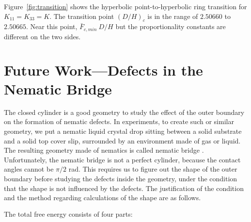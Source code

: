 \documentclass[nottitlepage]{article}
\begin{document}
       Figure~\ref{fig:transition} shows the hyperbolic point-to-hyperbolic ring transition for $K_{11}=K_{33}=K$. The transition point $(D/H)_c$ is in the range of $2.50660$ to $2.50665$. Near this point,  $\bar{F}_{c,min}~ D/H$ but the proportionality constants are different on the two sides.


     

     \section{Future Work---Defects in the Nematic Bridge}
The closed cylinder is a good geometry to study the effect of the outer boundary on the formation of nematic defects. In experiments, to create such or similar geometry, we put a nematic liquid crystal drop sitting between a solid substrate and a solid top cover slip, surrounded by an environment made of gas or liquid. The resulting geometry made of nematics is called nematic bridge \cite{vogel}. Unfortunately, the nematic bridge is not a perfect cylinder, because the contact angles cannot be $\pi/2$ rad. This requires us to figure out the shape of the outer boundary before studying the defects inside the geometry, under the condition that the shape is not influenced by the defects. The justification of the condition and the method regarding calculations of the shape are as follows.


The total free energy consists of four parts:
\end{document}
